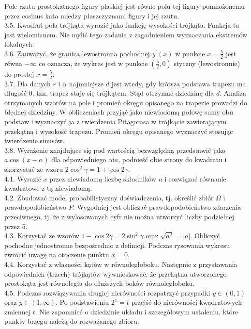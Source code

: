 \documentclass[10pt]{article}
\begin{document}
Pole rzutu prostokatnego figury plaskiej jest równe polu tej figury pomnożonemu przez cosinus kata miedzy płaszczyznami figury i jej rzutu.\\
3.5. Kwadrat pola trójkąta wyrazić jako funkcję wysokości trójkąta. Funkcja ta jest wielomianem. Nie mylić tego zadania z zagadnieniem wyznaczania ekstremów lokalnych.\\
3.6. Zauważyć, że granica lewostronna pochodnej $y^{\prime}(x)$ w punkcie $x=\frac{5}{2}$ jest równa $-\infty$ co oznacza, że wykres jest w punkcie $\left(\frac{5}{2}, 0\right)$ styczny (lewostronnie) do prostej $x=\frac{5}{2}$.\\
3.7. Dla danych $r$ i $\alpha$ najmniejsze $d$ jest wtedy, gdy krótsza podstawa trapezu ma długość 0, tzn. trapez staje się trójkątem. Stąd otrzymać dziedzinę dla $d$. Analiza otrzymanych wzorów na pole i promień okręgu opisanego na trapezie prowadzi do błẹdnej dziedziny. W obliczeniach przyjąć jako niewiadomą połowę sumy obu podstaw i wyznaczyć ja z twierdzenia Pitagorasa w trójkącie zawierającym przekątną i wysokość trapezu. Promień okręgu opisanego wyznaczyć stosując twierdzenie sinusów.\\
3.8. Wyrażenie znajdujące się pod wartością bezwzględną przedstawić jako $a \cos (x-\alpha)$ dla odpowiedniego $\alpha \mathrm{i} a$, podnieść obie strony do kwadratu i skorzystać ze wzoru $2 \cos ^{2} \gamma=1+\cos 2 \gamma$.\\
4.1. Wyrazić $x$ przez niewiadomą liczbę składników $n$ i rozwiązać równanie kwadratowe z tą niewiadomą.\\
4.2. Zbudować model probabilistyczny doświadczenia, tj. określić zbiór $\Omega$ i prawdopodobieństwo $P$. Wygodniej jest obliczać prawdopodobieństwo zdarzenia przeciwnego, tj. że z wylosowanych cyfr nie można utworzyć liczby podzielnej przez 5.\\
4.3. Korzystać ze wzorów $1-\cos 2 \gamma=2 \sin ^{2} \gamma$ oraz $\sqrt{a^{2}}=|a|$. Obliczyć pochodne jednostronne bezpośrednio z definicji. Podczas rysowania wykresu zwrócić uwagę na otoczenie punktu $x=0$.\\
4.4. Korzystać z własności kạtów w równoległoboku. Następnie z przystawania odpowiednich (trzech) trójkątów wywnioskować, że przekątna utworzonego prostokąta jest równoległa do dłuższych boków równoległoboku.\\
4.5. Podczas rozwiązywania drugiej nierówności rozpatrzyć przypadki $y \in(0,1)$ oraz $y \in(1, \infty)$. Po podstawieniu $2^{x}=t$ przejść do nierówności kwadratowych zmiennej $t$. Nie zapomnieć o dziedzinie układu i szczegółowym ustaleniu, które punkty brzegu należą do rozważanego zbioru.\\
\end{document}
